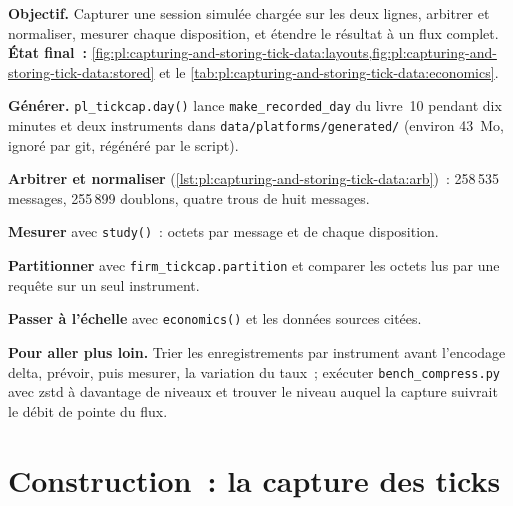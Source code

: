 \begin{tutorial}
\textbf{Objectif.} Capturer une session simulée chargée sur les deux lignes, arbitrer et normaliser, mesurer chaque disposition, et étendre le
résultat à un flux complet. \textbf{État final~:} \cref{fig:pl:capturing-and-storing-tick-data:layouts,fig:pl:capturing-and-storing-tick-data:stored}
et le \cref{tab:pl:capturing-and-storing-tick-data:economics}.
\begin{tutsteps}
\item \textbf{Générer.} \texttt{pl\_tickcap.day()} lance \texttt{make\_recorded\_day} du livre~10 pendant dix minutes et deux
instruments dans \texttt{data/platforms/generated/} (environ 43~Mo, ignoré par git, régénéré par le script).
\item \textbf{Arbitrer et normaliser} (\cref{lst:pl:capturing-and-storing-tick-data:arb})~: 258\,535 messages, 255\,899
doublons, quatre trous de huit messages.
\item \textbf{Mesurer} avec \texttt{study()}~: octets par message et  de chaque disposition.
\item \textbf{Partitionner} avec \texttt{firm\_tickcap.partition} et comparer les octets lus par une requête sur un seul instrument.
\item \textbf{Passer à l'échelle} avec \texttt{economics()} et les données sources citées.
\end{tutsteps}
\textbf{Pour aller plus loin.} Trier les enregistrements par instrument avant l'encodage delta, prévoir, puis mesurer, la variation
du taux~; exécuter \texttt{bench\_compress.py} avec zstd à davantage de niveaux et trouver le niveau auquel la capture suivrait le
débit de pointe du flux.
\end{tutorial}

\section{Construction~: la capture des ticks}\label{bld:pl:capturing-and-storing-tick-data:tickcap}

